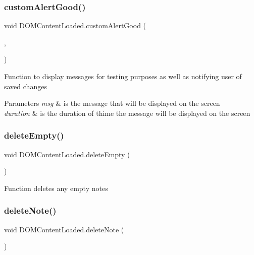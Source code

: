 \subsubsection{\texorpdfstring{custom\+Alert\+Good()}{customAlertGood()}}
{\footnotesize\ttfamily void D\+O\+M\+Content\+Loaded.\+custom\+Alert\+Good (\begin{DoxyParamCaption}\item[{msg}]{,  }\item[{duration}]{ }\end{DoxyParamCaption})\hspace{0.3cm}{\ttfamily [inline]}}

Function to display messages for testing purposes as well as notifying user of saved changes 
\begin{DoxyParams}{Parameters}
{\em msg} & is the message that will be displayed on the screen \\
\hline
{\em duration} & is the duration of thime the message will be displayed on the screen \\
\hline
\end{DoxyParams}
\mbox{\label{class_d_o_m_content_loaded_a0b00bc687c3f7bee87eccb2aa0e99098}} 
\subsubsection{\texorpdfstring{delete\+Empty()}{deleteEmpty()}}
{\footnotesize\ttfamily void D\+O\+M\+Content\+Loaded.\+delete\+Empty (\begin{DoxyParamCaption}{ }\end{DoxyParamCaption})\hspace{0.3cm}{\ttfamily [inline]}}

Function deletes any empty notes \mbox{\label{class_d_o_m_content_loaded_a08ab37a8c435636cf376a8748dce6f25}} 
\subsubsection{\texorpdfstring{delete\+Note()}{deleteNote()}}
{\footnotesize\ttfamily void D\+O\+M\+Content\+Loaded.\+delete\+Note (\begin{DoxyParamCaption}{ }\end{DoxyParamCaption})\hspace{0.3cm}{\ttfamily [inline]}}

